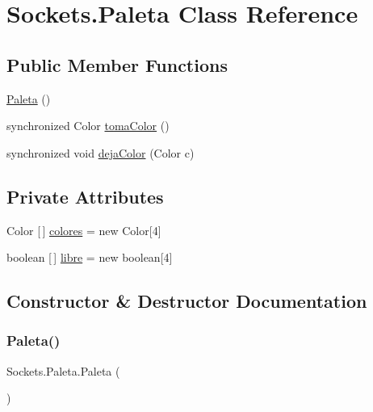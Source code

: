 \hypertarget{class_sockets_1_1_paleta}{}\section{Sockets.\+Paleta Class Reference}
\label{class_sockets_1_1_paleta}
\subsection*{Public Member Functions}
\begin{DoxyCompactItemize}
\item 
\mbox{\hyperlink{class_sockets_1_1_paleta_a45a4dcd40c9114d7124f6eb03669b9e7}{Paleta}} ()
\item 
synchronized Color \mbox{\hyperlink{class_sockets_1_1_paleta_a84e276825a78a7a716c088e1e4306c70}{toma\+Color}} ()
\item 
synchronized void \mbox{\hyperlink{class_sockets_1_1_paleta_aef920b8ba5dcf546887e48fe95dde588}{deja\+Color}} (Color c)
\end{DoxyCompactItemize}
\subsection*{Private Attributes}
\begin{DoxyCompactItemize}
\item 
Color \mbox{[}$\,$\mbox{]} \mbox{\hyperlink{class_sockets_1_1_paleta_ad5cfd090a42fa589849afd28beebf4e5}{colores}} = new Color\mbox{[}4\mbox{]}
\item 
boolean \mbox{[}$\,$\mbox{]} \mbox{\hyperlink{class_sockets_1_1_paleta_a836bc075d6bc794fbd6002483dda1534}{libre}} = new boolean\mbox{[}4\mbox{]}
\end{DoxyCompactItemize}


\subsection{Constructor \& Destructor Documentation}
\mbox{\label{class_sockets_1_1_paleta_a45a4dcd40c9114d7124f6eb03669b9e7}} 
\subsubsection{\texorpdfstring{Paleta()}{Paleta()}}
{\footnotesize\ttfamily Sockets.\+Paleta.\+Paleta (\begin{DoxyParamCaption}{ }\end{DoxyParamCaption})\hspace{0.3cm}{\ttfamily [inline]}}



